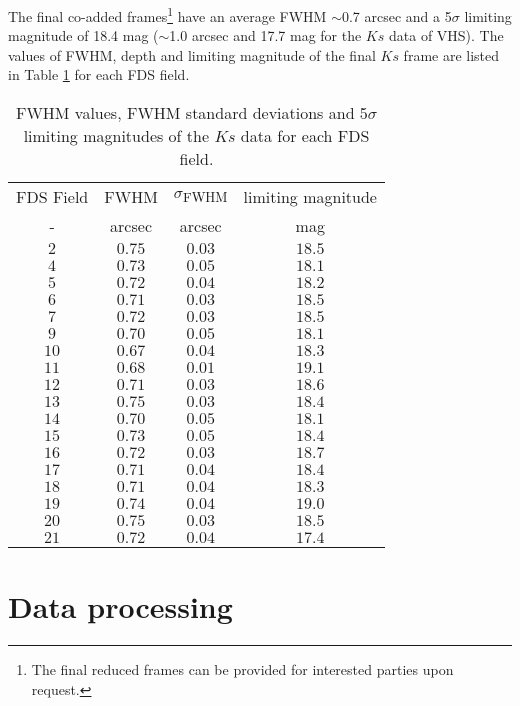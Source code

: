 \documentclass[fleqn,usenatbib]{mnras}
\begin{document}
The final co-added frames\footnote{The final reduced frames can be provided for interested parties upon request.} have an average FWHM $\sim$0.7 arcsec and a 5$\sigma$ limiting magnitude of 18.4 mag ($\sim$1.0 arcsec and 17.7 mag for the $Ks$ data of VHS). The values of FWHM, depth and limiting magnitude of the final $Ks$ frame are listed in Table \ref{fwhmanddepth} for each FDS field.

\begin{table}
\centering
\caption{FWHM values, FWHM standard deviations and 5$\sigma$ limiting magnitudes of the $Ks$ data for each FDS field.}
\begin{tabular}{ cccc } \hline  
FDS Field & FWHM & $\sigma$\textsubscript{FWHM} & limiting magnitude\\
- & arcsec & arcsec & mag\\ 
\hline
$2$ & $0.75$ & $0.03$ & $18.5$ \\ 
$4$ &  $0.73$ & $0.05$ &  $18.1$ \\ 
$5$ &  $0.72$ & $0.04$ &  $18.2$ \\ 
$6$ &  $0.71$ & $0.03$ &  $18.5$ \\ 
$7$ &  $0.72$ & $0.03$ &  $18.5$ \\ 
$9$ &  $0.70$ & $0.05$ & $18.1$ \\ 
$10$ &  $0.67$ & $0.04$ & $18.3$ \\  
$11$ & $0.68$ & $0.01$ & $19.1$ \\  
$12$ &  $0.71$ & $0.03$ &  $18.6$ \\  
$13$ &  $0.75$ & $0.03$ &  $18.4$ \\  
$14$ &  $0.70$ & $0.05$ & $18.1$ \\  
$15$ &  $0.73$ & $0.05$ & $18.4$ \\ 
$16$ &  $0.72$ & $0.03$ &  $18.7$ \\  
$17$ &  $0.71$ & $0.04$ &  $18.4$ \\  
$18$ & $0.71$ & $0.04$ & $18.3$ \\  
$19$ &  $0.74$ & $0.04$ & $19.0$ \\  
$20$ &  $0.75$ & $0.03$ &  $18.5$ \\ 
$21$ & $0.72$ & $0.04$ &  $17.4$ \\
\hline 
\end{tabular}
\label{fwhmanddepth}
\end{table}

\section{Data processing}
\label{sec3}
\end{document}
